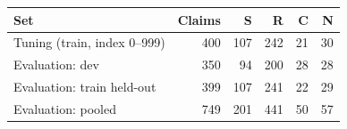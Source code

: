 \begin{tabular}{@{}lrrrrr@{}}
\toprule
Set & Claims & S & R & C & N \\
\midrule
Tuning (train, index 0--999) & 400 & 107 & 242 & 21 & 30 \\
Evaluation: dev & 350 & 94 & 200 & 28 & 28 \\
Evaluation: train held-out & 399 & 107 & 241 & 22 & 29 \\
\midrule
Evaluation: pooled & 749 & 201 & 441 & 50 & 57 \\
\bottomrule
\end{tabular}
